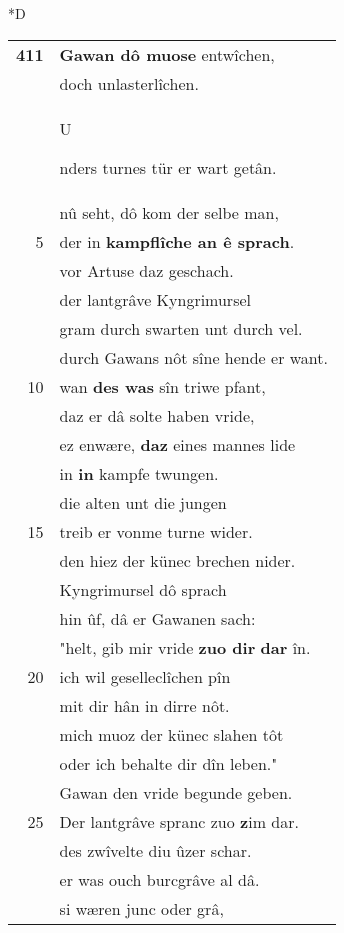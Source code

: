 \documentclass[8pt,a4paper,notitlepage]{article}
\begin{document}
\begin{table}[ht]
\begin{minipage}[t]{0.5\linewidth}
\small
\begin{center}*D
\end{center}
\begin{tabular}{rl}
\textbf{411} & \textbf{Gawan dô muose} entwîchen,\\ 
 & doch unlasterlîchen.\\ 
 & \begin{large}U\end{large}nders turnes tür er wart getân.\\ 
 & nû seht, dô kom der selbe man,\\ 
5 & der in \textbf{kampflîche an ê sprach}.\\ 
 & vor Artuse daz geschach.\\ 
 & der lantgrâve Kyngrimursel\\ 
 & gram durch swarten unt durch vel.\\ 
 & durch Gawans nôt sîne hende er want.\\ 
10 & wan \textbf{des was} sîn triwe pfant,\\ 
 & daz er dâ solte haben vride,\\ 
 & ez enwære, \textbf{daz} eines mannes lide\\ 
 & in \textbf{in} kampfe twungen.\\ 
 & die alten unt die jungen\\ 
15 & treib er vonme turne wider.\\ 
 & den hiez der künec brechen nider.\\ 
 & Kyngrimursel dô sprach\\ 
 & hin ûf, dâ er Gawanen sach:\\ 
 & "helt, gib mir vride \textbf{zuo dir} \textbf{dar} în.\\ 
20 & ich wil geselleclîchen pîn\\ 
 & mit dir hân in dirre nôt.\\ 
 & mich muoz der künec slahen tôt\\ 
 & oder ich behalte dir dîn leben."\\ 
 & Gawan den vride begunde geben.\\ 
25 & Der lantgrâve spranc zuo \textbf{z}im dar.\\ 
 & des zwîvelte diu ûzer schar.\\ 
 & er was ouch burcgrâve al dâ.\\ 
 & si wæren junc oder grâ,\\ 

\end{tabular}
\end{minipage}
\end{table}
\end{document}
